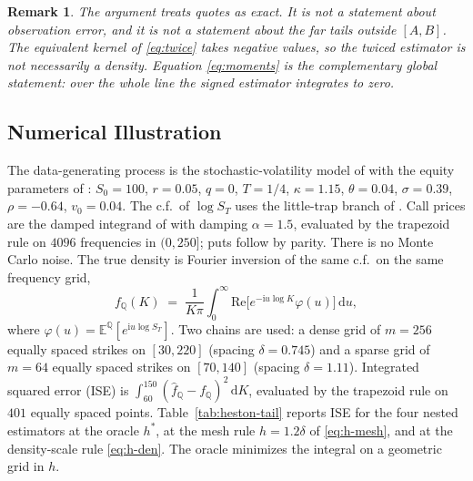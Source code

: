 \documentclass[preprint,12pt,authoryear,times]{elsarticle}
\newtheorem{remark}{Remark}
\newcommand{\E}{\mathbb{E}}
\newcommand{\Q}{\mathbb{Q}}
\begin{document}
\begin{remark}
The argument treats quotes as exact. It is not a statement about observation error, and it is not a statement about the far tails outside \([A,B]\). The equivalent kernel of \eqref{eq:twice} takes negative values, so the twiced estimator is not necessarily a density. Equation \eqref{eq:moments} is the complementary global statement: over the whole line the signed estimator integrates to zero.
\end{remark}

\subsection{Numerical Illustration}
\label{sec:heston}

The data-generating process is the stochastic-volatility model of \citet{heston1993} with the equity parameters of \citet{bakshi1997}: \(S_0=100\), \(r=0.05\), \(q=0\), \(T=1/4\), \(\kappa=1.15\), \(\theta=0.04\), \(\sigma=0.39\), \(\rho=-0.64\), \(v_0=0.04\). The c.f.\ of \(\log S_T\) uses the little-trap branch of \citet{albrecher2007}. Call prices are the damped integrand of \citet{carrmadan1999} with damping \(\alpha=1.5\), evaluated by the trapezoid rule on \(4096\) frequencies in \((0,250]\); puts follow by parity. There is no Monte Carlo noise. The true density is Fourier inversion of the same c.f.\ on the same frequency grid,
\begin{equation}
\label{eq:true-q}
f_{\Q}(K)
\;=\;
\frac1{K\pi}\int_0^\infty
\mathrm{Re}\bigl[e^{-\mathrm{i}u\log K}\varphi(u)\bigr]\,\mathrm{d}u,
\end{equation}
where \(\varphi(u)=\E^{\Q}[e^{\mathrm{i}u\log S_T}]\). Two chains are used: a dense grid of \(m=256\) equally spaced strikes on \([30,220]\) (spacing \(\delta=0.745\)) and a sparse grid of \(m=64\) equally spaced strikes on \([70,140]\) (spacing \(\delta=1.11\)). Integrated squared error (ISE) is \(\int_{60}^{150}(\hat f_{\Q}-f_{\Q})^2\,\mathrm{d}K\), evaluated by the trapezoid rule on \(401\) equally spaced points. Table~\ref{tab:heston-tail} reports ISE for the four nested estimators at the oracle \(h^{\ast}\), at the mesh rule \(h=1.2\delta\) of \eqref{eq:h-mesh}, and at the density-scale rule \eqref{eq:h-den}. The oracle minimizes the integral on a geometric grid in \(h\).
\end{document}
